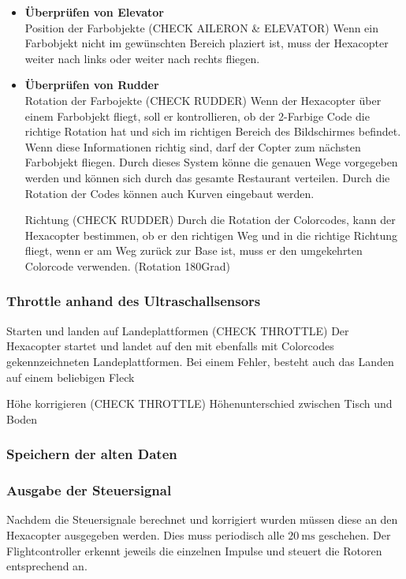 \begin{itemize}
\begin{itemize}
        \item \textbf{Überprüfen von Elevator}\\
        Position der Farbobjekte (CHECK AILERON \& ELEVATOR)
        Wenn ein Farbobjekt nicht im gewünschten Bereich plaziert ist, muss der Hexacopter weiter nach links oder weiter nach rechts fliegen.
        \item \textbf{Überprüfen von Rudder}\\
        Rotation der Farbojekte (CHECK RUDDER)
        Wenn der Hexacopter über einem Farbobjekt fliegt, soll er kontrollieren, ob der 2-Farbige Code die richtige Rotation hat und sich im richtigen Bereich des Bildschirmes befindet. Wenn diese Informationen richtig sind, darf der Copter zum nächsten Farbobjekt fliegen.
        Durch dieses System könne die genauen Wege vorgegeben werden und können sich durch das gesamte Restaurant verteilen. Durch die Rotation der Codes können auch Kurven eingebaut werden.

        Richtung (CHECK RUDDER)
        Durch die Rotation der Colorcodes, kann der Hexacopter bestimmen, ob er den richtigen Weg und in die richtige Richtung fliegt, wenn er am Weg zurück zur Base ist, muss er den umgekehrten Colorcode verwenden. (Rotation 180Grad)
      \end{itemize}

    \subsubsection{Throttle anhand des Ultraschallsensors}

    Starten und landen auf Landeplattformen (CHECK THROTTLE)
    Der Hexacopter startet und landet auf den mit ebenfalls mit Colorcodes gekennzeichneten Landeplattformen.
    Bei einem Fehler, besteht auch das Landen auf einem beliebigen Fleck

    Höhe korrigieren (CHECK THROTTLE)
    Höhenunterschied zwischen Tisch und Boden

    \subsubsection{Speichern der alten Daten}

    \subsubsection{Ausgabe der Steuersignal}
    Nachdem die Steuersignale berechnet und korrigiert wurden müssen diese an den Hexacopter ausgegeben werden. Dies muss periodisch alle $\SI{20}{\milli\second}$ geschehen.
    Der Flightcontroller erkennt jeweils die einzelnen Impulse und steuert die Rotoren entsprechend an.


\end{itemize}

